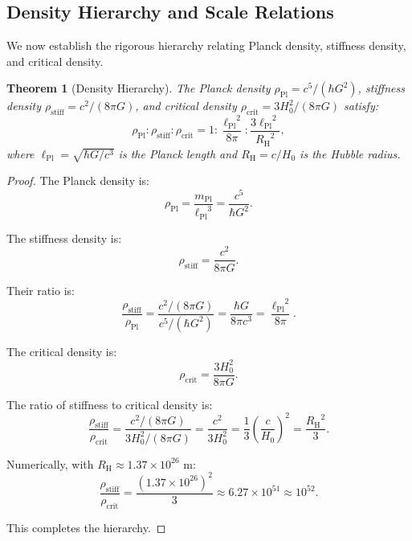 \documentclass[11pt,a4paper]{article}
\newcommand{\lPl}{\ensuremath{\ell_{\mathrm{Pl}}}}
\newcommand{\rhocrit}{\ensuremath{\rho_{\mathrm{crit}}}}
\newcommand{\rhostiff}{\ensuremath{\rho_{\mathrm{stiff}}}}
\newcommand{\rhoPl}{\ensuremath{\rho_{\mathrm{Pl}}}}
\newcommand{\RH}{\ensuremath{R_{\mathrm{H}}}}
\newtheorem{theorem}{Theorem}[section]
\theoremstyle{definition}
\theoremstyle{remark}
\begin{document}
\subsection{Density Hierarchy and Scale Relations}
\label{sec:density_hierarchy}

We now establish the rigorous hierarchy relating Planck density, stiffness density, and critical density.

\begin{theorem}[Density Hierarchy]
\label{thm:density_hierarchy}
The Planck density $\rhoPl = c^5/(\hbar G^2)$, stiffness density $\rhostiff = c^2/(8\pi G)$, and critical density $\rhocrit = 3H_0^2/(8\pi G)$ satisfy:
\begin{equation}
\boxed{\rhoPl : \rhostiff : \rhocrit = 1 : \frac{\lPl^2}{8\pi} : \frac{3\lPl^2}{\RH^2},}
\end{equation}
where $\lPl = \sqrt{\hbar G/c^3}$ is the Planck length and $\RH = c/H_0$ is the Hubble radius.
\end{theorem}

\begin{proof}
The Planck density is:
\begin{equation}
\rhoPl = \frac{m_{\mathrm{Pl}}}{\lPl^3} = \frac{c^5}{\hbar G^2}.
\end{equation}

The stiffness density is:
\begin{equation}
\rhostiff = \frac{c^2}{8\pi G}.
\end{equation}

Their ratio is:
\begin{equation}
\frac{\rhostiff}{\rhoPl} = \frac{c^2/(8\pi G)}{c^5/(\hbar G^2)} = \frac{\hbar G}{8\pi c^3} = \frac{\lPl^2}{8\pi}.
\end{equation}

The critical density is:
\begin{equation}
\rhocrit = \frac{3H_0^2}{8\pi G}.
\end{equation}

The ratio of stiffness to critical density is:
\begin{equation}
\frac{\rhostiff}{\rhocrit} = \frac{c^2/(8\pi G)}{3H_0^2/(8\pi G)} = \frac{c^2}{3H_0^2} = \frac{1}{3}\left(\frac{c}{H_0}\right)^2 = \frac{\RH^2}{3}.
\end{equation}

Numerically, with $\RH \approx 1.37 \times 10^{26}$ m:
\begin{equation}
\frac{\rhostiff}{\rhocrit} = \frac{(1.37 \times 10^{26})^2}{3} \approx 6.27 \times 10^{51} \approx 10^{52}.
\end{equation}

This completes the hierarchy. \qedhere
\end{proof}
\end{document}
